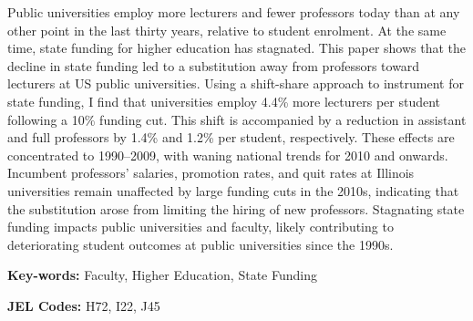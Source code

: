 Public universities employ more lecturers and fewer professors today than at any other point in the last thirty years, relative to student enrolment.
At the same time, state funding for higher education has stagnated.
This paper shows that the decline in state funding led to a substitution away from professors toward lecturers at US public universities.
Using a shift-share approach to instrument for state funding, I find that universities employ 4.4\% more lecturers per student following a 10\% funding cut.
This shift is accompanied by a reduction in assistant and full professors by 1.4\% and 1.2\%  per student, respectively.
These effects are concentrated to 1990--2009, with waning national trends for 2010 and onwards.
Incumbent professors' salaries, promotion rates, and quit rates at Illinois universities remain unaffected by large funding cuts in the 2010s, indicating that the substitution arose from limiting the hiring of new professors.
Stagnating state funding impacts public universities and faculty, likely contributing to deteriorating student outcomes at public universities since the 1990s.

\vfill
\noindent
\textbf{Key-words:}
Faculty,
Higher Education,
State Funding

\vspace{0.05cm}
\noindent
\textbf{JEL Codes:} H72, I22, J45
